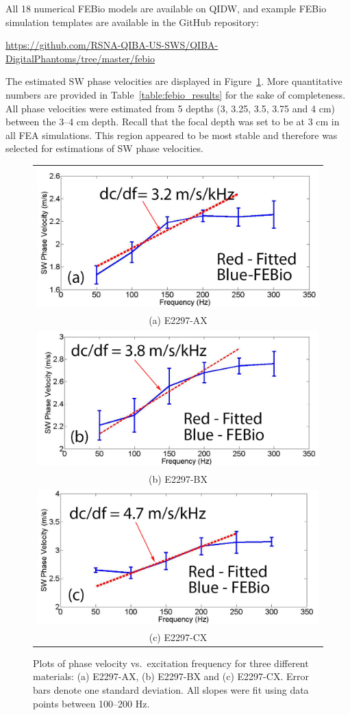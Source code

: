 All 18 numerical FEBio models are available on QIDW, and example FEBio
simulation templates are available in the GitHub repository:

\url{https://github.com/RSNA-QIBA-US-SWS/QIBA-DigitalPhantoms/tree/master/febio}

The estimated SW phase velocities are displayed in
Figure~\ref{fig:febio_results}. More quantitative numbers are provided in
Table~\ref{table:febio_results} for the sake of completeness. All phase
velocities were estimated from 5 depths (3, 3.25, 3.5, 3.75 and 4 cm) between
the 3--4 cm depth. Recall that the focal depth was set to be at 3 cm in all FEA
simulations. This region appeared to be most stable and therefore was selected
for estimations of SW phase velocities.

\begin{figure}[htb!]
    \centering
    \begin{tabular}{c}
    \includegraphics[width=0.5\linewidth]{figs/result1.jpg} \\
    (a) E2297-AX\\
    \includegraphics[width=0.5\linewidth]{figs/result2.jpg} \\
    (b) E2297-BX\\
    \includegraphics[width=0.5\linewidth]{figs/result3.jpg} \\
    (c) E2297-CX\\
    \end{tabular}
    \caption{Plots of phase velocity vs.\ excitation frequency for three
    different materials: (a) E2297-AX, (b) E2297-BX and (c) E2297-CX\@. Error
    bars denote one standard deviation. All slopes were fit using data points
    between 100--200 Hz.}
\label{fig:febio_results}
\end{figure}

